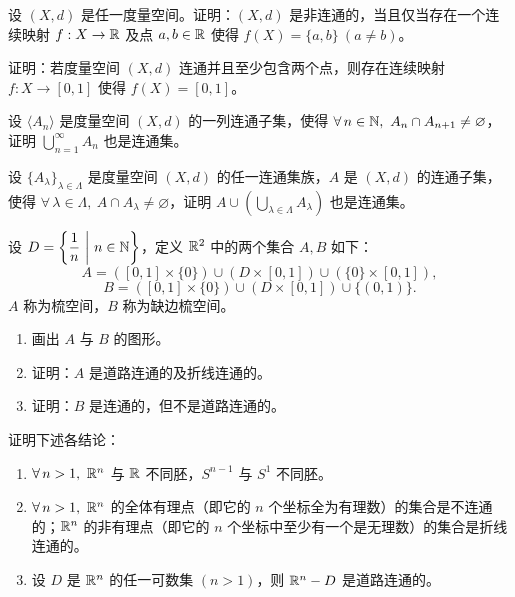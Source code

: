 \begin{exercise}
	\item 设 $(X,d)$ 是任一度量空间。证明：$(X,d)$ 是非连通的，当且仅当存在一个连续映射 $f:X\to\mathbb{R}$ 及点 $a,b\in\mathbb{R}$ 使得 $f(X)=\{a,b\}\ (a\neq b)$。
\end{exercise}

\begin{exercise}
	\item 证明：若度量空间 $(X,d)$ 连通并且至少包含两个点，则存在连续映射 $f:X\to[0,1]$ 使得 $f(X)=[0,1]$。
\end{exercise}

\begin{exercise}
	\item 设 $\langle A_n\rangle$ 是度量空间 $(X,d)$ 的一列连通子集，使得 $\forall\,n\in\N,\ A_n\cap A_{n+1}\neq\varnothing$，证明 $\displaystyle\bigcup_{n=1}^{\infty}A_n$ 也是连通集。
\end{exercise}

\begin{exercise}
	\item 设 $\{A_{\lambda}\}_{\lambda\in\Lambda}$ 是度量空间 $(X,d)$ 的任一连通集族，$A$ 是 $(X,d)$ 的连通子集，使得 $\forall\,\lambda\in\Lambda,\ A\cap A_{\lambda}\neq\varnothing$，证明 $A\cup\left(\displaystyle\bigcup_{\lambda\in\Lambda}A_{\lambda}\right)$ 也是连通集。
\end{exercise}

\begin{exercise}
	\item 设 $D=\left\{\dfrac{1}{n}\ \middle|\ n\in\N\right\}$，定义 $\mathbb{R}^2$ 中的两个集合 $A,B$ 如下：
	\[A=([0,1]\times\{0\})\cup(D\times[0,1])\cup(\{0\}\times[0,1]),\]
	\[B=([0,1]\times\{0\})\cup(D\times[0,1])\cup\{(0,1)\}.\]
	$A$ 称为梳空间，$B$ 称为缺边梳空间。

	\begin{enumerate}[label=\arabic*)]
		\item 画出 $A$ 与 $B$ 的图形。
		\item 证明：$A$ 是道路连通的及折线连通的。
		\item 证明：$B$ 是连通的，但不是道路连通的。
	\end{enumerate}
\end{exercise}

\begin{exercise}
	\item 证明下述各结论：
	\begin{enumerate}[label=\arabic*)]
		\item $\forall\,n>1,\ \mathbb{R}^n$ 与 $\mathbb{R}$ 不同胚，$S^{n-1}$ 与 $S^1$ 不同胚。
		\item $\forall\,n>1,\ \mathbb{R}^n$ 的全体有理点（即它的 $n$ 个坐标全为有理数）的集合是不连通的；$\mathbb{R}^n$ 的非有理点（即它的 $n$ 个坐标中至少有一个是无理数）的集合是折线连通的。
		\item 设 $D$ 是 $\mathbb{R}^n$ 的任一可数集 $(n>1)$，则 $\mathbb{R}^n-D$ 是道路连通的。
	\end{enumerate}
\end{exercise}

